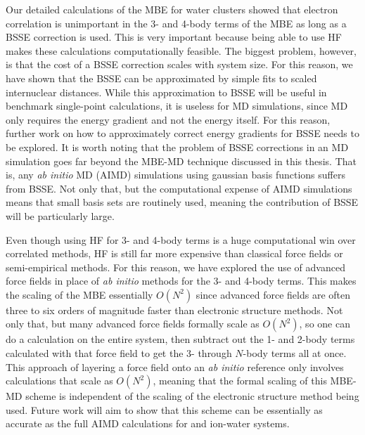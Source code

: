 \documentclass[11pt, proquest]{uwthesis}[2020/02/24]
\let\ce\ch
\begin{document}
\par Our detailed calculations of the MBE for water clusters showed that electron correlation is unimportant in the 3- and 4-body terms of the MBE as long as a BSSE correction is used. This is very important because being able to use HF makes these calculations computationally feasible. The biggest problem, however, is that the cost of a BSSE correction scales with system size. For this reason, we have shown that the BSSE can be approximated by simple fits to scaled internuclear distances. While this approximation to BSSE will be useful in benchmark single-point calculations, it is useless for MD simulations, since MD only requires the energy gradient and not the energy itself. For this reason, further work on how to approximately correct energy gradients for BSSE needs to be explored. It is worth noting that the problem of BSSE corrections in an MD simulation goes far beyond the MBE-MD technique discussed in this thesis. That is, any \textit{ab initio} MD (AIMD) simulations using gaussian basis functions suffers from BSSE. Not only that, but the computational expense of AIMD simulations means that small basis sets are routinely used, meaning the contribution of BSSE will be particularly large.

\par Even though using HF for 3- and 4-body terms is a huge computational win over correlated methods, HF is still far more expensive than classical force fields or semi-empirical methods. For this reason, we have explored the use of advanced force fields in place of \textit{ab initio} methods for the 3- and 4-body terms. This makes the scaling of the MBE essentially $O(N^2)$ since advanced force fields are often three to six orders of magnitude faster than electronic structure methods. Not only that, but many advanced force fields formally scale as $O(N^2)$, so one can do a calculation on the entire system, then subtract out the 1- and 2-body terms calculated with that force field to get the 3- through $N$-body terms all at once. This approach of layering a force field onto an \textit{ab initio} reference only involves calculations that scale as $O(N^2)$, meaning that the formal scaling of this MBE-MD scheme is independent of the scaling of the electronic structure method being used. Future work will aim to show that this scheme can be essentially as accurate as the full AIMD calculations for \ce{H2O_{10}} and ion-water systems.
\end{document}
